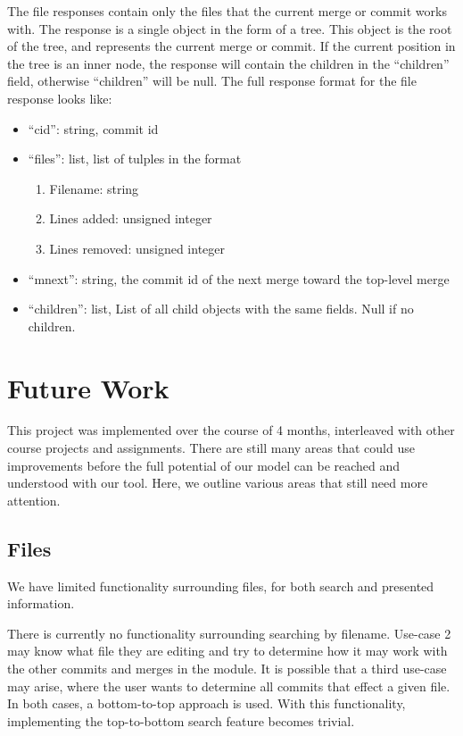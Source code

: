 \documentclass[conference, draftclsnofoot]{IEEEtran}
\begin{document}
The file responses contain only the files that the current merge or commit
works with. The response is a single object in the form of a tree. This object
is the root of the tree, and represents the current merge or commit. If the
current position in the tree is an inner node, the response will contain the
children in the ``children'' field, otherwise ``children'' will be null. The
full response format for the file response looks like:

\begin{itemize}
        \item ``cid'': string, commit id
        \item ``files'': list, list of tulples in the format
                \begin{enumerate}
                        \item Filename: string
                        \item Lines added: unsigned integer
                        \item Lines removed: unsigned integer
                \end{enumerate}
        \item ``mnext'': string, the commit id of the next merge toward the
                top-level merge
        \item ``children'': list, List of all child objects with the same
                fields. Null if no children.
\end{itemize}

\section{Future Work}
This project was implemented over the course of 4 months, interleaved with
other course projects and assignments. There are still many areas that could
use improvements before the full potential of our model can be reached and
understood with our tool. Here, we outline various areas that still need more
attention.

\subsection{Files}
We have limited functionality surrounding files, for both search and presented
information.

There is currently no functionality surrounding searching by filename. Use-case
2 may know what file they are editing and try to determine how it may work with
the other commits and merges in the module. It is possible that a third
use-case may arise, where the user wants to determine all commits that effect a
given file. In both cases, a bottom-to-top approach is used. With this
functionality, implementing the top-to-bottom search feature becomes trivial.
\end{document}
